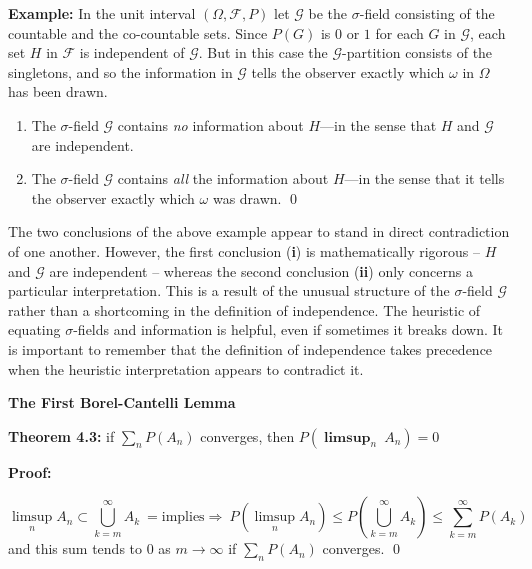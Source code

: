 \vspace{2ex}

\textbf{Example:} In the unit interval $(\Omega, \mathcal{F}, P)$ let $\mathcal{G}$ be the $\sigma$-field consisting of the countable and the co-countable sets. Since $P(G)$ is $0$ or $1$ for each $G$ in $\mathcal{G}$, each set $H$ in $\mathcal{F}$ is independent of $\mathcal{G}$. But in this case the $\mathcal{G}$-partition consists of the singletons, and so the information in $\mathcal{G}$ tells the observer exactly which $\omega$ in $\Omega$ has been drawn.
\begin{enumerate}[label=\textbf{\roman*.}, topsep=1pt, itemsep=0.5ex]
    \item The $\sigma$-field $\mathcal{G}$ contains \textit{no} information about $H$—in the sense that $H$ and $\mathcal{G}$ are independent. \item The $\sigma$-field $\mathcal{G}$ contains \textit{all} the information about $H$—in the sense that it tells the observer exactly which $\omega$ was drawn. \hfill \qed
\end{enumerate}

\vspace{2ex}

The two conclusions of the above example appear to stand in direct contradiction of one another. However, the first conclusion (\textbf{i}) is mathematically rigorous -- $H$ and $\mathcal{G}$ are independent -- whereas the second conclusion (\textbf{ii}) only concerns a particular interpretation. This is a result of the unusual structure of the $\sigma$-field $\mathcal{G}$ rather than a shortcoming in the definition of independence. The heuristic of equating $\sigma$-fields and information is helpful, even if sometimes it breaks down. It is important to remember that the definition of independence takes precedence when the heuristic interpretation appears to contradict it.


 \quad

\vspace{2ex}

\textbf{The First Borel-Cantelli Lemma}

\textbf{Theorem 4.3: } if $\sum_n P(A_n)$ converges, then $P(\boldsymbol{\limsup}_n\ A_n)=0$

\textbf{Proof:}
\vspace{-1ex}
\begin{proofline}
    $$\limsup_n A_n \subset \bigcup_{k=m}^{\infty} A_k \ =\text{implies}\Rightarrow\ P(\limsup_n A_n) \leq P\left(\bigcup_{k=m}^{\infty} A_k\right) \leq \sum_{k=m}^{\infty} P(A_k)$$ and this sum tends to $0$ as $m \to \infty$ if $\sum_n P(A_n)$ converges. \hfill \qed
\end{proofline}

